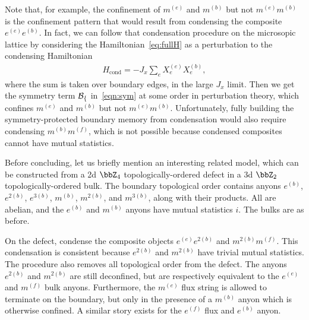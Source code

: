 Note that, for example, the confinement of $m^{(e)}$ and $m^{(b)}$ but not $m^{(e)}m^{(b)}$ is the confinement pattern that would result from condensing the composite $e^{(e)}e^{(b)}$. In fact, we can follow that condensation procedure on the microsopic lattice by considering the Hamiltonian~\eqref{eq:fullH} as a perturbation to the condensing Hamiltonian 
\begin{align}
H_\text{cond} = -J_x \sum_{e}X_e^{(e)}X_e^{(b)},
\end{align}
where the sum is taken over boundary edges, in the large $J_x$ limit. Then we get the symmetry term $\cal{B}_f$ in~\eqref{eqn:sym} at some order in perturbation theory, which confines $m^{(e)}$ and $m^{(b)}$ but not $m^{(e)}m^{(b)}$. Unfortunately, fully building the symmetry-protected boundary memory from condensation would also require condensing $m^{(b)}m^{(f)}$, which is not possible because condensed composites cannot have mutual statistics. 

Before concluding, let us briefly mention an interesting related model, which can be constructed from a 2d $\bbZ_4$ topologically-ordered defect in a 3d $\bbZ_2$ topologically-ordered bulk. The boundary topological order contains anyons $e^{(b)}$, $e^{2(b)}$, $e^{3(b)}$, $m^{(b)}$, $m^{2(b)}$, and $m^{3(b)}$, along with their products. All are abelian, and the $e^{(b)}$ and $m^{(b)}$ anyons have mutual statistics $i$. The bulks are as before. 

On the defect, condense the composite objects $e^{(e)}e^{2(b)}$ and $m^{2(b)}m^{(f)}$. This condensation is consistent because $e^{2(b)}$ and $m^{2(b)}$ have trivial mutual statistics. The procedure also removes all topological order from the defect. The anyons $e^{2(b)}$ and $m^{2(b)}$ are still deconfined, but are respectively equivalent to the $e^{(e)}$ and $m^{(f)}$ bulk anyons. Furthermore, the $m^{(e)}$ flux string is allowed to terminate on the boundary, but only in the presence of a $m^{(b)}$ anyon which is otherwise confined. A similar story exists for the $e^{(f)}$ flux and $e^{(b)}$ anyon. 

